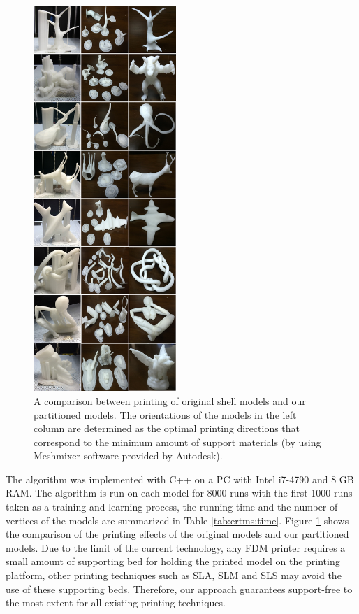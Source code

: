 \begin{figure}[tbp]
  \centering
  \includegraphics[width=0.48\textwidth]{figs/experiment.png}
  \caption{\label{fig:experiment}%
           A comparison between printing of original shell models and our partitioned models. The orientations of the models in the left column are determined as the optimal printing directions that correspond to the minimum amount of support materials (by using Meshmixer software provided by Autodesk). }
\end{figure}

The algorithm was implemented with C++ on a PC with Intel i7-4790 and 8 GB RAM. The algorithm is run on each model for 8000 runs with the first 1000 runs taken as a training-and-learning process, the running time and the number of vertices of the models are summarized in Table \ref{tab:ertms:time}. Figure \ref{fig:experiment} shows the comparison of the printing effects of the original models and our partitioned models. Due to the limit of the current technology, any FDM printer requires a small amount of supporting bed for holding the printed model on the printing platform, other printing techniques such as SLA, SLM and SLS may avoid the use of these supporting beds. Therefore, our approach guarantees support-free to the most extent for all existing printing techniques.

